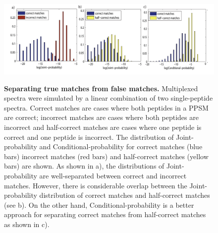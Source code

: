 \documentclass[arial,11pt]{article}
\begin{document}
\begin{figure}
	\centering
	 \includegraphics[height=45mm, width=135mm]{figures/MixGF_separation_true_false_matches}
		\caption{\footnotesize {\bf Separating true matches from false matches.}
		Multiplexed spectra were simulated by a linear combination of two single-peptide spectra. Correct matches are cases where both peptides in a PPSM are correct; incorrect matches are cases where both peptides are incorrect and half-correct matches are cases where one peptide is correct and one peptide is incorrect. The distribution of Joint-probability and Conditional-probability for correct matches (blue bars) incorrect matches (red bars) and half-correct matches (yellow bars) are shown.  As shown in a), the distributions of Joint-probability are well-separated between correct and incorrect matches. However, there is considerable overlap between the Joint-probability distribution of correct matches and half-correct matches (see b).  On the other hand, Conditional-probability is a better approach for separating correct matches from half-correct matches as shown in c).}
\label{separate}
\end{figure}
\end{document}
